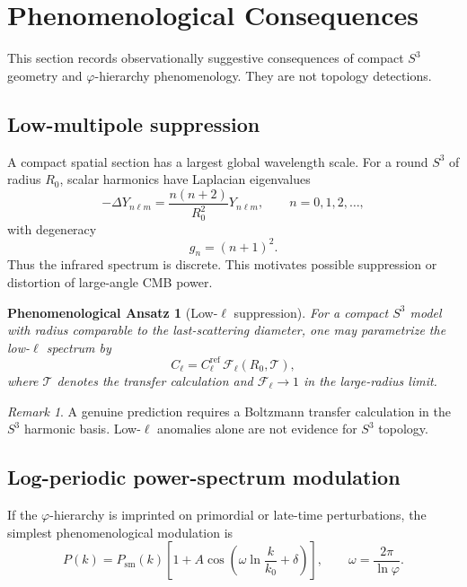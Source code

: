 \documentclass[11pt,a4paper]{article}
\newtheorem{ansatz}[theorem]{Phenomenological Ansatz}
\theoremstyle{definition}
\theoremstyle{remark}
\newtheorem{remark}[theorem]{Remark}
\newcommand{\Sthree}{S^{3}}
\newcommand{\golden}{\varphi}
\begin{document}
\section{Phenomenological Consequences}

This section records observationally suggestive consequences of compact $\Sthree$ geometry and
$\golden$-hierarchy phenomenology.  They are not topology detections.

\subsection{Low-multipole suppression}

A compact spatial section has a largest global wavelength scale.  For a round $\Sthree$ of
radius $R_{0}$, scalar harmonics have Laplacian eigenvalues
\begin{equation}
-\Delta Y_{n\ell m}=\frac{n(n+2)}{R_{0}^{2}}Y_{n\ell m},
\qquad n=0,1,2,\ldots,
\label{eq:laplace-spectrum}
\end{equation}
with degeneracy
\begin{equation}
g_{n}=(n+1)^{2}.
\end{equation}
Thus the infrared spectrum is discrete.  This motivates possible suppression or distortion of
large-angle CMB power.

\begin{ansatz}[Low-$\ell$ suppression]
For a compact $\Sthree$ model with radius comparable to the last-scattering diameter, one may
parametrize the low-$\ell$ spectrum by
\begin{equation}
C_{\ell}=C_{\ell}^{\mathrm{ref}}\,
\mathcal{F}_{\ell}(R_{0},\mathcal{T}),
\end{equation}
where $\mathcal{T}$ denotes the transfer calculation and
$\mathcal{F}_{\ell}\to1$ in the large-radius limit.
\end{ansatz}

\begin{remark}
A genuine prediction requires a Boltzmann transfer calculation in the $\Sthree$ harmonic basis.
Low-$\ell$ anomalies alone are not evidence for $\Sthree$ topology.
\end{remark}

\subsection{Log-periodic power-spectrum modulation}

If the $\golden$-hierarchy is imprinted on primordial or late-time perturbations, the simplest
phenomenological modulation is
\begin{equation}
P(k)=P_{\mathrm{sm}}(k)\left[1+A\cos\left(\omega\ln\frac{k}{k_{0}}+\delta\right)\right],
\qquad
\omega=\frac{2\pi}{\ln\golden}.
\label{eq:logperiodic}
\end{equation}
\end{document}

